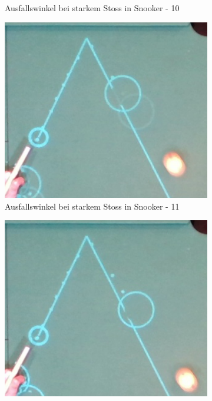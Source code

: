 \begin{figure}[h!]
\begin{subfigure}[t]{0.2\textwidth}
        \caption{Ausfallswinkel bei starkem Stoss in Snooker - 10}
        \label{fig:rebound_angle_fast_snooker_10}
    \end{subfigure}
    \hfill
    \begin{subfigure}[t]{0.2\textwidth}
        \centering
        \includegraphics[width=1.0\linewidth]{../common/04_results/resources/simulation/rebound_angle_fast_snooker/00_rail_rebound_angle_fast_snooker_11.png}
        \caption{Ausfallswinkel bei starkem Stoss in Snooker - 11}
        \label{fig:rebound_angle_fast_snooker_11}
    \end{subfigure}
    \hfill
    \begin{subfigure}[t]{0.2\textwidth}
        \centering
        \includegraphics[width=1.0\linewidth]{../common/04_results/resources/simulation/rebound_angle_fast_snooker/00_rail_rebound_angle_fast_snooker_12.png}

\end{subfigure}
\end{figure}
